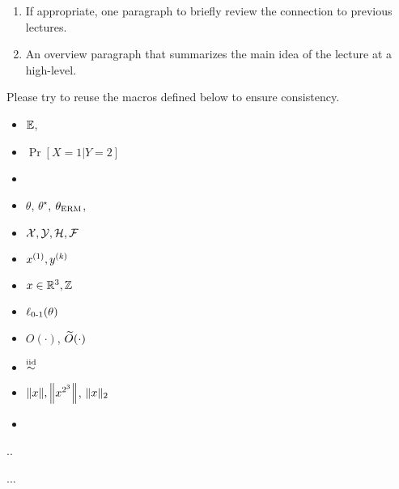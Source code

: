 




\begin{enumerate}
	\item If appropriate, one paragraph to briefly review the connection to previous lectures.
	\item An overview paragraph that summarizes the main idea of the lecture at a high-level. 
\end{enumerate}  
Please try to reuse the macros defined below to ensure consistency.
\begin{itemize}
	\item $\Exp$, 
	\item $\Pr[X=1\vert Y=2]$
	\item 
	\item 
	$\theta$, $\theta^\star$, $\thetaerm$, 
	\item 
	$\cX,\cY, \cH, \cF$
	\item $x\sp{1}, y\sp{k}$
	\item 
	$x\in \R^3, \bbZ$
	\item $\err(\theta)$
	\item $O(\cdot)$, $\tilO(\cdot)$
	\item $\iid$
	\item $\norm{x}, \Norm{x^{2^3}}$, $\norm{x}_{2}$
	\item 
\end{itemize}
\begin{theorem}
	..
\end{theorem}
\begin{lemma}
	...
\end{lemma}


	
\lipsum
